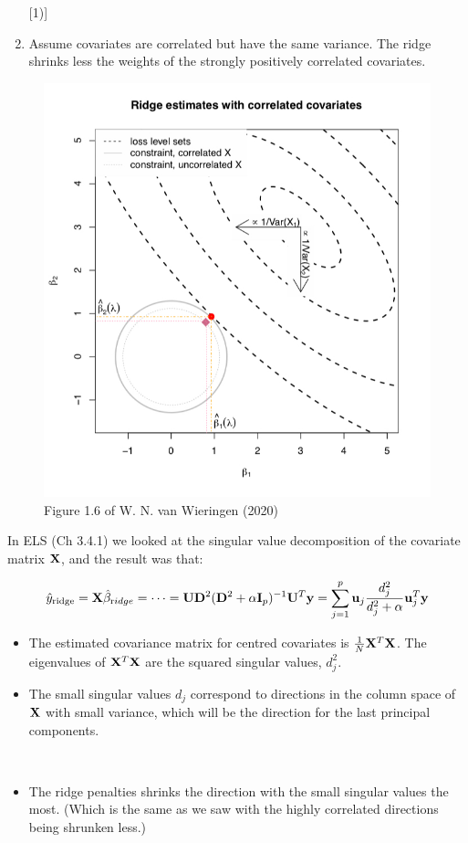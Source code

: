 \documentclass[
  ignorenonframetext,
]{beamer}
\providecommand{\tightlist}{%
  \setlength{\itemsep}{0pt}\setlength{\parskip}{0pt}}
\begin{document}
\begin{frame}
\begin{enumerate}
[1)]
\setcounter{enumi}{2}
\tightlist
\item
  Assume covariates are correlated but have the same variance. The ridge
  shrinks less the weights of the strongly positively correlated
  covariates.
\end{enumerate}

\begin{figure}
\includegraphics[width=0.6\linewidth]{WNvWfig16left} \caption{Figure 1.6 of W. N. van Wieringen (2020)}\label{fig:unnamed-chunk-7}
\end{figure}
\end{frame}

\begin{frame}
In ELS (Ch 3.4.1) we looked at the singular value decomposition of the
covariate matrix \({\bf X}\), and the result was that:

\[\hat{y}_{\text{ridge}}={\bf X}\hat{\beta}_{\text ridge}= \cdots =
{\bf U}{\bf D}^2({\bf D}^2+\alpha {\bf I}_p)^{-1}{\bf U}^T {\bf y}=
\sum_{j=1}^p {\bf u}_j \frac{d_j^2}{d_j^2+\alpha}{\bf u}_j^T {\bf y}\]

\begin{itemize}
\tightlist
\item
  The estimated covariance matrix for centred covariates is
  \(\frac{1}{N}{\bf X}^T{\bf X}\). The eigenvalues of
  \({\bf X}^T{\bf X}\) are the squared singular values, \(d^2_j\).
\item
  The small singular values \(d_j\) correspond to directions in the
  column space of \({\bf X}\) with small variance, which will be the
  direction for the last principal components.
\end{itemize}

\(~\)

\begin{itemize}
\tightlist
\item
  The ridge penalties shrinks the direction with the small singular
  values the most. (Which is the same as we saw with the highly
  correlated directions being shrunken less.)
\end{itemize}

\(~\)
\end{frame}
\end{document}
